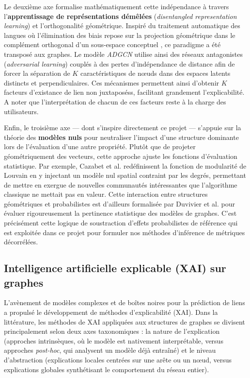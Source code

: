 Le deuxième axe formalise mathématiquement cette indépendance à travers l'\textbf{apprentissage de représentations démêlées} (\textit{disentangled representation learning}) et l'orthogonalité géométrique. Inspiré du traitement automatique des langues où l'élimination des biais repose sur la projection géométrique dans le complément orthogonal d'un sous-espace conceptuel \cite{schumann2024prejudice}, ce paradigme a été transposé aux graphes. Le modèle \textit{ADGCN} \cite{zheng2021adversarial} utilise ainsi des réseaux antagonistes (\textit{adversarial learning}) couplés à des pertes d'indépendance de distance afin de forcer la séparation de $K$  caractéristiques de nœuds dans des espaces latents distincts et perpendiculaires. Ces mécanismes permettent ainsi d'obtenir $K$ facteurs d'existance de lien non juxtaposéss, facilitant grandement l'explicabilité. A noter que l'interprétation de chacun de ces facteurs reste à la charge des utilisateurs.

Enfin, le troisième axe — dont s'inspire directement ce projet — s'appuie sur la théorie des \textbf{modèles nuls} pour neutraliser l'impact d'une structure dominante lors de l'évaluation d'une autre propriété. Plutôt que de projeter géométriquement des vecteurs, cette approche ajuste les fonctions d'évaluation statistique. Par exemple, Cazabet et al. \cite{cazabet2022enhancing} redéfinissent la fonction de modularité de Louvain en y injectant un modèle nul spatial contraint par les degrés, permettant de mettre en exergue de nouvelles communautés intéressantes que l'algorithme classique ne mettait pas en valeur. Cette interaction entre structures géométriques et probabilistes est d'ailleurs formalisée par Duvivier et al. \cite{duvivier2024graph} pour évaluer rigoureusement la pertinence statistique des modèles de graphes. C'est précisément cette logique de soustraction d'effets probabilistes de référence qui est exploitée dans ce projet pour formuler nos méthodes d'inférence de métriques décorrélées.


\subsection{Intelligence artificielle explicable (XAI) sur graphes}

L'avènement de modèles complexes et de boîtes noires pour la prédiction de liens a propulsé le développement de méthodes d'explicabilité (XAI). Dans la littérature, les méthodes de XAI appliquées aux structures de graphes se divisent principalement selon deux axes taxonomiques : la nature de l'explication (approches intrinsèques, où le modèle est nativement interprétable, versus approches \textit{post-hoc}, qui analysent un modèle déjà entraîné) et le niveau d'abstraction (explications locales centrées sur une arête ou un nœud, versus explications globales synthétisant le comportement du réseau entier).


